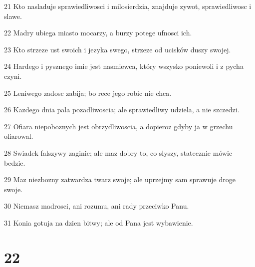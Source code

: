 \par 21 Kto nasladuje sprawiedliwosci i milosierdzia, znajduje zywot, sprawiedliwosc i slawe.
\par 22 Madry ubiega miasto mocarzy, a burzy potege ufnosci ich.
\par 23 Kto strzeze ust swoich i jezyka swego, strzeze od ucisków duszy swojej.
\par 24 Hardego i pysznego imie jest nasmiewca, który wszysko poniewoli i z pycha czyni.
\par 25 Leniwego zadosc zabija; bo rece jego robic nie chca.
\par 26 Kazdego dnia pala pozadliwoscia; ale sprawiedliwy udziela, a nie szczedzi.
\par 27 Ofiara niepoboznych jest obrzydliwoscia, a dopieroz gdyby ja w grzechu ofiarowal.
\par 28 Swiadek falszywy zaginie; ale maz dobry to, co slyszy, statecznie mówic bedzie.
\par 29 Maz niezbozny zatwardza twarz swoje; ale uprzejmy sam sprawuje droge swoje.
\par 30 Niemasz madrosci, ani rozumu, ani rady przeciwko Panu.
\par 31 Konia gotuja na dzien bitwy; ale od Pana jest wybawienie.

\chapter{22}

